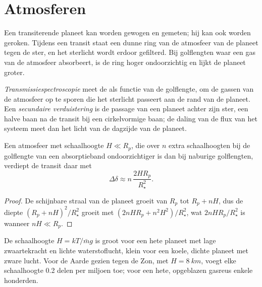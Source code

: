 \section{Atmosferen}\label{sec:b3:exoplanets:atmospheres}

Een transiterende planeet kan worden gewogen en gemeten; hij kan ook worden geroken.
Tijdens een transit staat een dunne ring van de atmosfeer van de planeet tegen
de ster, en het sterlicht wordt erdoor gefilterd. Bij golflengten waar een gas
van de atmosfeer absorbeert, is de ring hoger ondoorzichtig en lijkt de
planeet groter.

\begin{definition}\label{def:b3:exoplanets:transmission}
\emph{Transmissiespectroscopie} meet
de  als functie van de golflengte, om de gassen van de
atmosfeer op te sporen die het sterlicht passeert aan de rand van de planeet. Een
\emph{secundaire verduistering} is de passage van een
planeet achter zijn ster, een halve baan na de transit bij een cirkelvormige
baan; de daling van de flux van het systeem meet dan het licht van de
dagzijde van de planeet.
\end{definition}

\begin{proposition}[Transmissiesignaal]\label{prop:b3:exoplanets:transmission}
Een atmosfeer met schaalhoogte $H \ll R_p$, die over $n$ extra
schaalhoogten bij de golflengte van een absorptieband ondoorzichtiger is dan bij
naburige golflengten, verdiept de transit daar met
\[
\Delta\delta \approx n\,\frac{2HR_p}{R_\star^2} .
\]
\end{proposition}

\begin{proof}
De schijnbare straal van de planeet groeit van $R_p$ tot $R_p + nH$, dus de
diepte $(R_p + nH)^2/R_\star^2$ groeit met $(2nHR_p + n^2H^2)/R_\star^2$,
wat $2nHR_p/R_\star^2$ is wanneer $nH \ll R_p$.
\end{proof}

De schaalhoogte $H = kT/\bar m g$ is groot voor een hete planeet met lage
zwaartekracht en lichte waterstoflucht, klein voor een koele, dichte planeet met
zware lucht. Voor de Aarde gezien tegen de Zon, met $H = \qty{8}{km}$,
voegt elke schaalhoogte 0.2 delen per miljoen toe; voor een hete, opgeblazen
gasreus enkele honderden.

